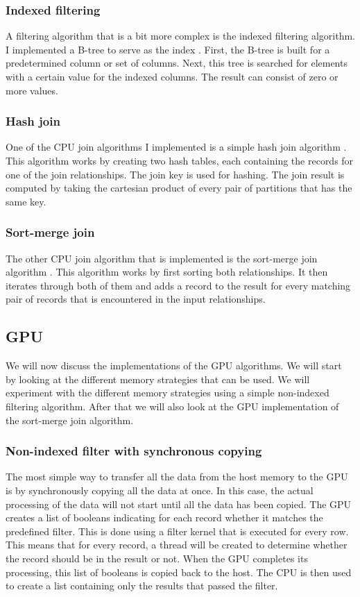 \documentclass[a4paper,titlepage]{article}
\begin{document}
\subsubsection{Indexed filtering}
A filtering algorithm that is a bit more complex is the indexed filtering algorithm. I implemented a B-tree to serve as the index \cite{comer1979}. First, the B-tree is built for a predetermined column or set of columns. Next, this tree is searched for elements with a certain value for the indexed columns. The result can consist of zero or more values.

\subsubsection{Hash join}
One of the CPU join algorithms I implemented is a simple hash join algorithm \cite{dewitt1985}. This algorithm works by creating two hash tables, each containing the records for one of the join relationships. The join key is used for hashing. The join result is computed by taking the cartesian product of every pair of partitions that has the same key.

\subsubsection{Sort-merge join}
The other CPU join algorithm that is implemented is the sort-merge join algorithm \cite{blasgen1977}. This algorithm works by first sorting both relationships. It then iterates through both of them and adds a record to the result for every matching pair of records that is encountered in the input relationships.

\subsection{GPU}
\label{sec:gpu-implementation}
We will now discuss the implementations of the GPU algorithms. We will start by looking at the different memory strategies that can be used. We will experiment with the different memory strategies using a simple non-indexed filtering algorithm. After that we will also look at the GPU implementation of the sort-merge join algorithm.

\subsubsection{Non-indexed filter with synchronous copying}
The most simple way to transfer all the data from the host memory to the GPU is by synchronously copying all the data at once. In this case, the actual processing of the data will not start until all the data has been copied. The GPU creates a list of booleans indicating for each record whether it matches the predefined filter. This is done using a filter kernel that is executed for every row. This means that for every record, a thread will be created to determine whether the record should be in the result or not. When the GPU completes its processing, this list of booleans is copied back to the host. The CPU is then used to create a list containing only the results that passed the filter.
\end{document}
